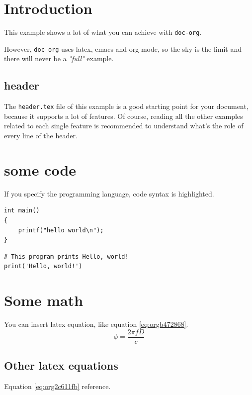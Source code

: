 


\maketitle
\thispagestyle{empty}
\newpage

\tableofcontents
\newpage

\pagestyle{plain}

\section{Introduction}
\label{sec:org38b8e0d}
This example shows a lot of what you can achieve with \texttt{doc-org}.

However, \texttt{doc-org} uses latex, emacs and org-mode, so the sky is the limit and
there will never be a \emph{"full"} example.

\subsection{header}
\label{sec:orgfb72df9}
The \texttt{header.tex} file of this example is a good starting point for your
document, because it supports a lot of features.
Of course, reading all the other examples related to each single feature is
recommended to understand what's the role of every line of the header.
\section{some code}
\label{sec:org0373a05}
If you specify the programming language, code syntax is highlighted.
\begin{verbatim}
int main()
{
    printf("hello world\n");
}
\end{verbatim}

\begin{verbatim}
# This program prints Hello, world!
print('Hello, world!')
\end{verbatim}

\section{Some math}
\label{sec:org00f7095}
You can insert latex equation, like equation \ref{eq:orgb472868}.
\begin{equation}
\label{eq:orgb472868}
\phi = \frac{2\pi fD}{c}
\end{equation}
\subsection{Other latex equations}
\label{sec:org5aeae6b}
Equation \ref{eq:org2c611fb} reference.


